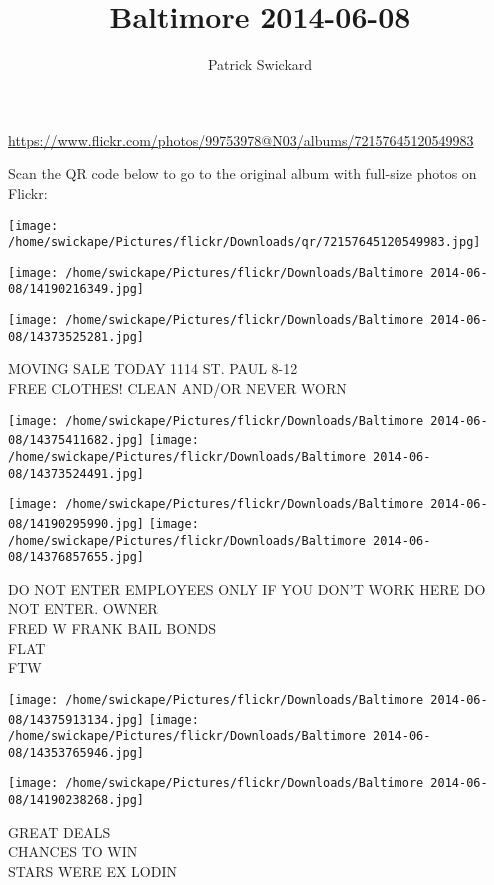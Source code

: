 \documentclass[10pt,letterpaper]{article}
\title{Baltimore 2014-06-08}
\author{Patrick Swickard}
\date{}
\begin{document}
\maketitle

\url{https://www.flickr.com/photos/99753978@N03/albums/72157645120549983}

Scan the QR code below to go to the original album with full-size photos on Flickr:

\texttt{[image: /home/swickape/Pictures/flickr/Downloads/qr/72157645120549983.jpg]}
\pagebreak

\texttt{[image: /home/swickape/Pictures/flickr/Downloads/Baltimore 2014-06-08/14190216349.jpg]}

\vspace{0.25in}
\texttt{[image: /home/swickape/Pictures/flickr/Downloads/Baltimore 2014-06-08/14373525281.jpg]}

MOVING SALE TODAY 1114 ST. PAUL 8{-}12\\
FREE CLOTHES! CLEAN AND/OR NEVER WORN
\pagebreak

\texttt{[image: /home/swickape/Pictures/flickr/Downloads/Baltimore 2014-06-08/14375411682.jpg]}
\texttt{[image: /home/swickape/Pictures/flickr/Downloads/Baltimore 2014-06-08/14373524491.jpg]}

\texttt{[image: /home/swickape/Pictures/flickr/Downloads/Baltimore 2014-06-08/14190295990.jpg]}
\texttt{[image: /home/swickape/Pictures/flickr/Downloads/Baltimore 2014-06-08/14376857655.jpg]}

DO NOT ENTER EMPLOYEES ONLY IF YOU DON'T WORK HERE DO NOT ENTER.  OWNER\\
FRED W FRANK BAIL BONDS\\
FLAT\\
FTW
\pagebreak

\texttt{[image: /home/swickape/Pictures/flickr/Downloads/Baltimore 2014-06-08/14375913134.jpg]}
\texttt{[image: /home/swickape/Pictures/flickr/Downloads/Baltimore 2014-06-08/14353765946.jpg]}

\vspace{0.25in}
\texttt{[image: /home/swickape/Pictures/flickr/Downloads/Baltimore 2014-06-08/14190238268.jpg]}

GREAT DEALS\\
CHANCES TO WIN\\
STARS WERE EX LODIN
\pagebreak
\end{document}
